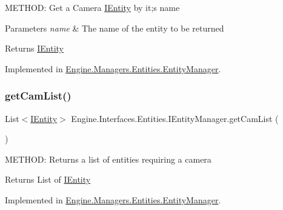 M\+E\+T\+H\+OD\+: Get a Camera \hyperlink{a00438}{I\+Entity} by it;s name 


\begin{DoxyParams}{Parameters}
{\em name} & The name of the entity to be returned\\
\hline
\end{DoxyParams}
\begin{DoxyReturn}{Returns}
\hyperlink{a00438}{I\+Entity}
\end{DoxyReturn}


Implemented in \hyperlink{a00518_ab3ff805a060af38748444e520995d8fa}{Engine.\+Managers.\+Entities.\+Entity\+Manager}.

\mbox{\label{a00442_a6a6229acffece1f804ba440cf847820d}} 
\subsubsection{\texorpdfstring{get\+Cam\+List()}{getCamList()}}
{\footnotesize\ttfamily List$<$\hyperlink{a00438}{I\+Entity}$>$ Engine.\+Interfaces.\+Entities.\+I\+Entity\+Manager.\+get\+Cam\+List (\begin{DoxyParamCaption}{ }\end{DoxyParamCaption})}



M\+E\+T\+H\+OD\+: Returns a list of entities requiring a camera 

\begin{DoxyReturn}{Returns}
List of \hyperlink{a00438}{I\+Entity}
\end{DoxyReturn}


Implemented in \hyperlink{a00518_a13ec76267682ed1ce3ace63c561ec6c5}{Engine.\+Managers.\+Entities.\+Entity\+Manager}.

\mbox{\label{a00442_adff1edf326874f25e8a90bf45f020120}} 
